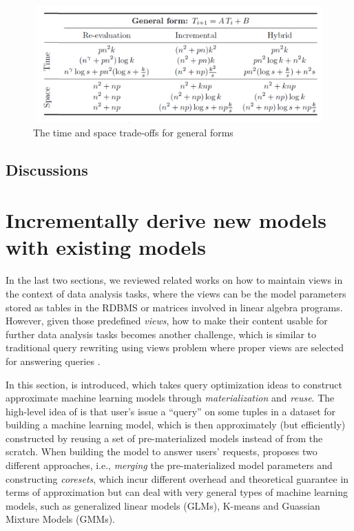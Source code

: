\begin{figure}
    \centering
    \includegraphics[width=12cm, height=4.5cm]{Figures/time_space_complexity_general_form.png}
    \caption{The time and space trade-offs for general forms}
    \label{fig:time_space_complexity_general_form}
\end{figure}


\subsection{Discussions}

\section{Incrementally derive new models with existing models}
In the last two sections, we reviewed related works on how to maintain views in the context of data analysis tasks, where the views can be the model parameters stored as tables in the RDBMS or matrices involved in linear algebra programs. However, given those predefined {\em views}, how to make their content usable for further data analysis tasks becomes another challenge, which is similar to traditional query rewriting using views problem where proper views are selected for answering queries \cite{halevy2001answering}.

In this section, \cite{hasani2018efficient} is introduced, which takes query optimization ideas to construct approximate machine learning models through {\em materialization} and {\em reuse}. The high-level idea of \cite{hasani2018efficient} is that user's issue a ``query'' on some tuples in a dataset for building a machine learning model, which is then approximately (but efficiently) constructed by reusing a set of pre-materialized models instead of from the scratch. When building the model to answer users' requests, \cite{hasani2018efficient} proposes two different approaches, i.e., {\em merging} the pre-materialized model parameters and constructing {\em coresets}, which incur different overhead and theoretical guarantee in terms of approximation but can deal with very general types of machine learning models, such as generalized linear models (GLMs), K-means and Guassian Mixture Models (GMMs).

